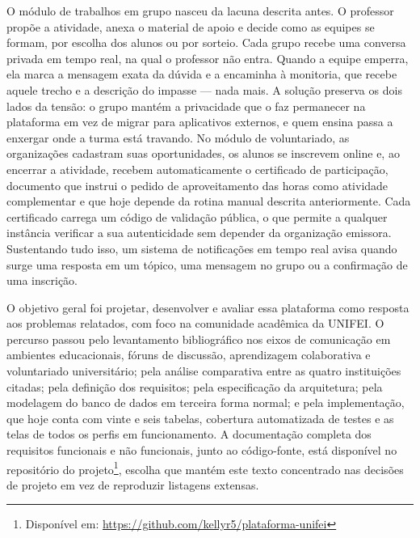 O módulo de trabalhos em grupo nasceu da lacuna descrita antes. O professor propõe a atividade, anexa o material de apoio e decide como as equipes se formam, por escolha dos alunos ou por sorteio. Cada grupo recebe uma conversa privada em tempo real, na qual o professor não entra. Quando a equipe emperra, ela marca a mensagem exata da dúvida e a encaminha à monitoria, que recebe aquele trecho e a descrição do impasse — nada mais. A solução preserva os dois lados da tensão: o grupo mantém a privacidade que o faz permanecer na plataforma em vez de migrar para aplicativos externos, e quem ensina passa a enxergar onde a turma está travando. No módulo de voluntariado, as organizações cadastram suas oportunidades, os alunos se inscrevem online e, ao encerrar a atividade, recebem automaticamente o certificado de participação, documento que instrui o pedido de aproveitamento das horas como atividade complementar e que hoje depende da rotina manual descrita anteriormente. Cada certificado carrega um código de validação pública, o que permite a qualquer instância verificar a sua autenticidade sem depender da organização emissora. Sustentando tudo isso, um sistema de notificações em tempo real avisa quando surge uma resposta em um tópico, uma mensagem no grupo ou a confirmação de uma inscrição.

O objetivo geral foi projetar, desenvolver e avaliar essa plataforma como resposta aos problemas relatados, com foco na comunidade acadêmica da UNIFEI. O percurso passou pelo levantamento bibliográfico nos eixos de comunicação em ambientes educacionais, fóruns de discussão, aprendizagem colaborativa e voluntariado universitário; pela análise comparativa entre as quatro instituições citadas; pela definição dos requisitos; pela especificação da arquitetura; pela modelagem do banco de dados em terceira forma normal; e pela implementação, que hoje conta com vinte e seis tabelas, cobertura automatizada de testes e as telas de todos os perfis em funcionamento. A documentação completa dos requisitos funcionais e não funcionais, junto ao código-fonte, está disponível no repositório do projeto\footnote{Disponível em: \url{https://github.com/kellyr5/plataforma-unifei}}, escolha que mantém este texto concentrado nas decisões de projeto em vez de reproduzir listagens extensas.

